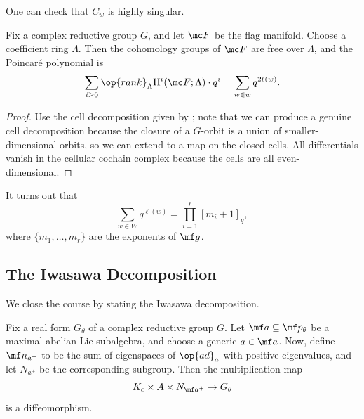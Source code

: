\documentclass[../notes.tex]{subfiles}
\begin{document}
\begin{remark} \label{rem:closure-cell}
	One can check that $\overline C_w$ is highly singular.
\end{remark}
\begin{proposition}
	Fix a complex reductive group $G$, and let $\mc F$ be the flag manifold. Choose a coefficient ring $\Lambda$. Then the cohomology groups of $\mc F$ are free over $\Lambda$, and the Poincar\'e polynomial is
	\[\sum_{i\ge0}\op{rank}_\Lambda\mathrm H^i(\mc F;\Lambda)\cdot q^i=\sum_{w\in w}q^{2\ell(w)}.\]
\end{proposition}
\begin{proof}
	Use the cell decomposition given by ; note that we can produce a genuine cell decomposition because the closure of a $G$-orbit is a union of smaller-dimensional orbits, so we can extend to a map on the closed cells. All differentials vanish in the cellular cochain complex because the cells are all even-dimensional.
\end{proof}
\begin{remark}
	It turns out that
	\[\sum_{w\in W}q^{\ell(w)}=\prod_{i=1}^r[m_i+1]_q,\]
	where $\{m_1,\ldots,m_r\}$ are the exponents of $\mf g$.
\end{remark}

\subsection{The Iwasawa Decomposition}
We close the course by stating the Iwasawa decomposition.
\begin{theorem}
	Fix a real form $G_\theta$ of a complex reductive group $G$. Let $\mf a\subseteq\mf p_\theta$ be a maximal abelian Lie subalgebra, and choose a generic $a\in\mf a$. Now, define $\mf n_{a^+}$ to be the sum of eigenspaces of $\op{ad}_a$ with positive eigenvalues, and let $N_{a^+}$ be the corresponding subgroup. Then the multiplication map
	\[K_c\times A\times N_{\mf a^+}\to G_\theta\]
	is a diffeomorphism.
\end{theorem}
\end{document}
